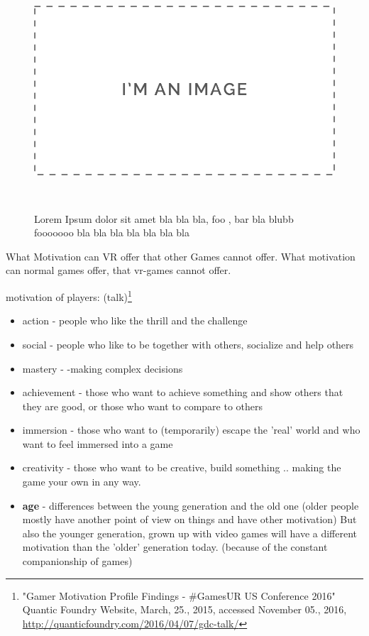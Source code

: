 \begin{figure}
	\centering
	\includegraphics[width=0.9\columnwidth]{./figures/placeholder}
	\caption[blabla]{Lorem Ipsum dolor sit amet bla bla bla, foo , bar bla blubb fooooooo bla bla bla bla bla bla bla}~\label{fig:foobar3}
\end{figure}


What Motivation can VR offer that other Games cannot offer. What motivation can normal games offer, that vr-games cannot offer.

motivation of players: (talk)\footnote{"Gamer Motivation Profile Findings - \#GamesUR US Conference 2016" Quantic Foundry Website, March, 25., 2015, accessed November 05., 2016, \url{http://quanticfoundry.com/2016/04/07/gdc-talk/}}
\begin{itemize}
	\item action - people who like the thrill and the challenge
	\item social - people who like to be together with others, socialize and help others
	\item mastery - -making complex decisions
	\item achievement - those who want to achieve something and show others that they are good, or those who want to compare to others
	\item immersion - those who want to (temporarily) escape the 'real' world and who want to feel immersed into a game
	\item creativity - those who want to be creative, build something .. making the game your own in any way. 
	\item \textbf{age} - differences between the young generation and the old one (older people mostly have another point of view on things and have other motivation) But also the younger generation, grown up with video games will have a different motivation than the 'older' generation today. (because of the constant companionship of games)
\end{itemize}

